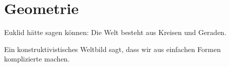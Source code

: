 \chapter{Geometrie}

Euklid hätte sagen können: Die Welt besteht aus Kreisen und Geraden.

Ein konstruktivistisches Weltbild sagt, dass wir aus einfachen Formen komplizierte machen.

